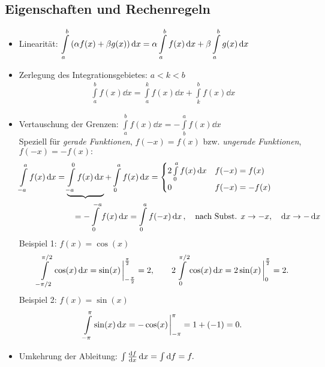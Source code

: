 \subsection{Eigenschaften und Rechenregeln}

\begin{itemize}
    \item Linearität: $\displaystyle \int\limits_{a}^{b} \qty(\alpha f(x)+\beta g(x)) \dd{x} = \alpha \int\limits_{a}^{b} f(x) \dd{x} + \beta \int\limits_{a}^{b} g(x) \dd{x}$ 
    \item Zerlegung des Integrationsgebietes: $a < k < b$ 
    \begin{align}
        \int\limits_{a}^{b} f(x) \dd{x} = \int\limits_{a}^{k} f(x) \dd{x} + \int\limits_{k}^{b} f(x) \dd{x}
    \end{align}
    \item Vertauschung der Grenzen: $\displaystyle \int\limits_{a}^{b} f(x) \dd{x} = - \int\limits_{b}^{a}f(x) \dd{x}$\\
    Speziell für \emph{gerade Funktionen}, $f(-x) = f(x)$ bzw. \emph{ungerade Funktionen}, $f(-x) = -f(x):$
    \begin{align}
        \int\limits_{-a}^{a} f(x) \dd{x} &= \underbrace{\int\limits_{-a}^{0}f(x) \dd{x}} + \int\limits_{0}^{a} f(x) \dd{x} = \begin{cases}
            2 \int\limits_{0}^{a} f(x) \dd{x} & f(-x) = f(x)\\ 0 & f(-x) = -f(x)
        \end{cases} \\
        & \qquad = -\int\limits_{0}^{-a} f(x) \dd{x} = \int\limits_{0}^{a} f(-x) \dd{x}, \quad \text{nach Subst. } x \to -x, \quad \dd{x} \to -\dd{x} \notag 
    \end{align}
    Beispiel 1: $f(x) = \cos (x)$ 
    \begin{align}
        \int\limits_{-\pi/2}^{\pi/2} \cos(x) \dd{x} = \sin(x)\eval_{-\frac{\pi}{2}}^{\frac{\pi}{2}}= 2,   \qquad 2 \int\limits_{0}^{\pi/2} \cos(x)\dd{x} = 2 \sin(x)\eval_0^{\frac{\pi}{2}} = 2.
    \end{align}
    Beispiel 2: $f(x) = \sin (x)$ \vspace{-4mm}
    \begin{align}
        \int\limits_{-\pi}^{\pi} \sin(x) \dd{x} = -\cos(x)\eval_{-\pi}^{\pi} = 1+(-1) = 0.
    \end{align}
    \item Umkehrung der Ableitung: $\int \dv{f}{x} \dd{x} = \int \dd{f} = f.$
\end{itemize}


